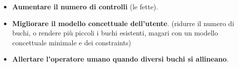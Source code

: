 \begin{itemize}
	\item \textbf{Aumentare il numero di controlli} (le fette).
	\item \textbf{Migliorare il modello concettuale dell'utente}. (ridurre il numero di buchi, o rendere più piccoli i buchi esistenti, magari con un modello concettuale minimale e dei constraints)
	\item \textbf{Allertare l'operatore umano quando diversi buchi si allineano}.
\end{itemize}

\pagebreak



\pagebreak
